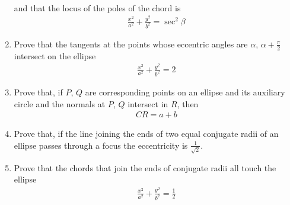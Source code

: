 \begin{enumerate}[1.]
\begin{align*}
\end{align*}
and that the locus of the poles of the chord is
\begin{align*}
\frac{x^2}{a^2}+\frac{y^2}{b^2} = \sec^2\beta
\end{align*}
\item Prove that the tangents at the points whose eccentric angles are $\alpha$, $\alpha+\frac{\pi}{2}$ intersect on the ellipse
\begin{align*}
\frac{x^2}{a^2}+\frac{y^2}{b^2} = 2
\end{align*}
\item Prove that, if $P$, $Q$ are corresponding points on an ellipse and its auxiliary circle and the normals
at $P$, $Q$ intersect in $R$, then
\begin{align*}
CR = a+b
\end{align*}
\item Prove that, if the line joining the ends of two equal conjugate radii of an ellipse passes through
a focus the eccentricity is $\frac{1}{\sqrt{2}}$.
\item Prove that the chords that join the ends of conjugate radii all touch the ellipse
\begin{align*}
\frac{x^2}{a^2}+\frac{y^2}{b^2} = \frac{1}{2}
\end{align*}

\end{enumerate}